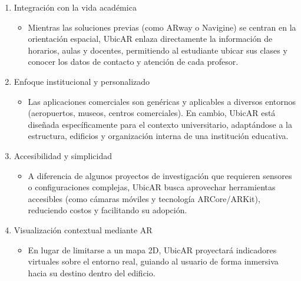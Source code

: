 \begin{enumerate}
	
	\item Integración con la vida académica
	
	\begin{itemize}
		
		\item Mientras las soluciones previas (como ARway o Navigine) se centran en la orientación espacial, UbicAR enlaza directamente la información de horarios, aulas y docentes, permitiendo al estudiante ubicar sus clases y conocer los datos de contacto y atención de cada profesor.
		
	\end{itemize}
	
	\item Enfoque institucional y personalizado
	
	\begin{itemize}
		
		\item Las aplicaciones comerciales son genéricas y aplicables a diversos entornos (aeropuertos, museos, centros comerciales). En cambio, UbicAR está diseñada específicamente para el contexto universitario, adaptándose a la estructura, edificios y organización interna de una institución educativa.
		
	\end{itemize}
	
	\item Accesibilidad y simplicidad
	
	\begin{itemize}
		
		\item A diferencia de algunos proyectos de investigación que requieren sensores o configuraciones complejas, UbicAR busca aprovechar herramientas accesibles (como cámaras móviles y tecnología ARCore/ARKit), reduciendo costos y facilitando su adopción.
		
	\end{itemize}
	
	\item Visualización contextual mediante AR
	
	\begin{itemize}
		
		\item En lugar de limitarse a un mapa 2D, UbicAR proyectará indicadores virtuales sobre el entorno real, guiando al usuario de forma inmersiva hacia su destino dentro del edificio.
		

\end{itemize}
\end{enumerate}
